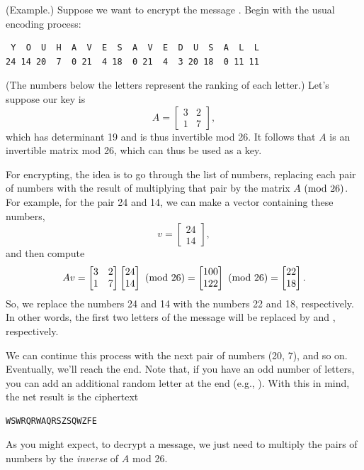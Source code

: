 \documentclass[letterpaper]{article}
\begin{document}
\begin{mdframed}
    (Example.) Suppose we want to encrypt the message \textbf{}. Begin with the usual encoding process: 
    \begin{mdframed}
        \begin{verbatim}
 Y  O  U  H  A  V  E  S  A  V  E  D  U  S  A  L  L
24 14 20  7  0 21  4 18  0 21  4  3 20 18  0 11 11\end{verbatim}
    \end{mdframed} 
    (The numbers below the letters represent the ranking of each letter.) Let's suppose our key is \[A = \begin{bmatrix}
        3 & 2 \\ 1 & 7
    \end{bmatrix},\] which has determinant 19 and is thus invertible mod 26. It follows that $A$ is an invertible matrix mod 26, which can thus be used as a key. 

    \bigskip 

    For encrypting, the idea is to go through the list of numbers, replacing each pair of numbers with the result of multiplying that pair by the matrix $A \ (\mathrm{mod}\ 26)$. For example, for the pair 24 and 14, we can make a vector containing these numbers, \[v = \begin{bmatrix}
        24 \\ 14
    \end{bmatrix},\] and then compute \[Av = \begin{bmatrix}
        3 & 2 \\ 1 & 7
    \end{bmatrix} \begin{bmatrix}
        24 \\ 14
    \end{bmatrix} \ (\mathrm{mod}\ 26) = \begin{bmatrix}
        100 \\ 122
    \end{bmatrix} \ (\mathrm{mod}\ 26) = \begin{bmatrix}
        22 \\ 18
    \end{bmatrix}.\]
    So, we replace the numbers 24 and 14 with the numbers 22 and 18, respectively. In other words, the first two letters of the message will be replaced by  and , respectively. 

    \bigskip 

    We can continue this process with the next pair of numbers (20, 7), and so on. Eventually, we'll reach the end. Note that, if you have an odd number of letters, you can add an additional random letter at the end (e.g., ). With this in mind, the net result is the ciphertext
    \begin{mdframed}
\begin{verbatim}
WSWRQRWAQRSZSQWZFE\end{verbatim}
    \end{mdframed}

    As you might expect, to decrypt a message, we just need to multiply the pairs of numbers by the \emph{inverse} of $A$ mod 26.
\end{mdframed}
\end{document}
